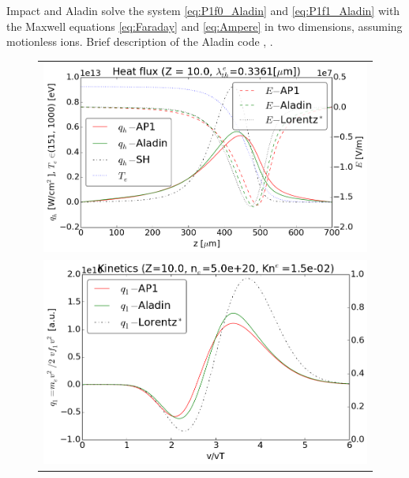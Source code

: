 Impact and Aladin solve the system \eqref{eq:P1f0_Aladin} 
and \eqref{eq:P1f1_Aladin} with the Maxwell equations  
\eqref{eq:Faraday} and \eqref{eq:Ampere} in two dimensions, 
assuming motionless ions.
Brief description of the Aladin code , .




\begin{figure}[tbh]
  \begin{center}
    \begin{tabular}{c}
      \includegraphics[width=\figscale\textwidth]{../VFPdata/C7_Aladin_case3_heatflux.png} \\
      \includegraphics[width=\figscale\textwidth]{../VFPdata/C7_Aladin_case3_kinetics.png} \\

\end{tabular}
\end{center}
\end{figure}
